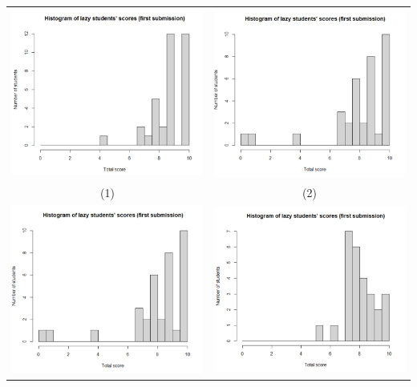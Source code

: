 \documentclass[a4paper]{article}
\theoremstyle{definition}
\begin{document}
\begin{enumerate}[a)]
\begin{itemize}
\begin{center}
\begin{tabular}{c c}
                 \includegraphics[width = 6.9cm]{Images/img7-1-1.png} & \includegraphics[width = 6.9cm]{Images/img7-1-2.png} \\
                 (1) & (2) \\
                 \includegraphics[width = 6.9cm]{Images/img7-1-2.png} &
                 \includegraphics[width = 6.9cm]{Images/img7-1-4.png} \\

\end{tabular}
\end{center}
\end{itemize}
\end{enumerate}
\end{document}
